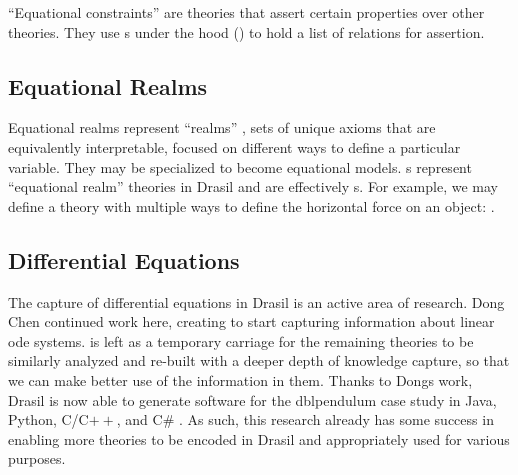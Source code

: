 ``Equational constraints'' are theories that assert certain properties over
other theories. They use \ConstraintSet{}s under the hood
() to hold a list of relations for assertion.

\currentExampleEquationalConstraintsHaskell{}

\currentConstraintSetHaskell{}

\subsection{Equational Realms}
\label{chap:more-theory-kinds:sec:classify-all-the-theories:subsec:equational-realms}

Equational realms represent ``realms'' \cite{Carette2014realms}, sets of unique axioms that are equivalently
interpretable, focused on different ways to define a particular variable. They
may be specialized to become equational models. \EquationalRealm{}s represent
``equational realm'' theories in Drasil and are effectively \MultiDefn{}s. For
example, we may define a theory with multiple ways to define the horizontal
force on an object: .

\currentExampleEquationalRealmHaskell{}

\currentMultiDefnHaskell{}

\currentDefiningExprHaskell{}

\subsection{Differential Equations}
\label{chap:more-theory-kinds:sec:classify-all-the-theories:subsec:differential-equations}

The capture of differential equations in Drasil is an active area of research.
Dong Chen continued work here, creating \NewDEModel{} \cite{Chen2022MEng} to
start capturing information about linear \acs{ode} systems. \DEModel{} is left
as a temporary carriage for the remaining theories to be similarly analyzed and
re-built with a deeper depth of knowledge capture, so that we can make better
use of the information in them. Thanks to Dongs work, Drasil is now able to
generate software for the \acs{dblpendulum} case study in Java, Python, C/C$++$,
and C\# \cite{Chen2022MEng}. As such, this research already has some success in
enabling more theories to be encoded in Drasil and appropriately used for
various purposes.

